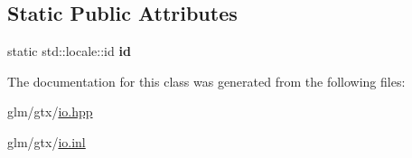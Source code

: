 \subsection*{Static Public Attributes}
\begin{DoxyCompactItemize}
\item 
\hypertarget{classglm_1_1io_1_1format__punct_a763f60aeaecec9290917ed1d83b79838}{static std\-::locale\-::id {\bfseries id}}\label{classglm_1_1io_1_1format__punct_a763f60aeaecec9290917ed1d83b79838}

\end{DoxyCompactItemize}


The documentation for this class was generated from the following files\-:\begin{DoxyCompactItemize}
\item 
glm/gtx/\hyperlink{io_8hpp}{io.\-hpp}\item 
glm/gtx/\hyperlink{io_8inl}{io.\-inl}\end{DoxyCompactItemize}
